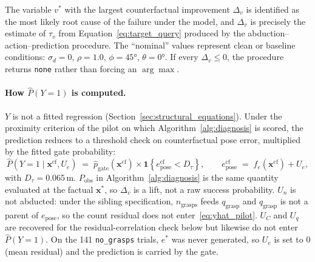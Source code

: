 \documentclass[11pt,a4paper]{report}
\begin{document}
The variable $v^*$ with the largest counterfactual improvement $\Delta_v$ is identified as the most likely root cause of the failure under the model, and $\Delta_v$ is precisely the estimate of $\tau_v$ from Equation~\eqref{eq:target_query} produced by the abduction--action--prediction procedure. The ``nominal'' values represent clean or baseline conditions: $\sigma_d = 0$, $\rho = 1.0$, $\phi = 45°$, $\theta = 0°$. If every $\Delta_v \le 0$, the procedure returns \texttt{none} rather than forcing an $\arg\max$.

\paragraph{How $\hat{P}(Y{=}1)$ is computed.} $Y$ is not a fitted regression (Section~\ref{sec:structural_equations}). Under the proximity criterion of the pilot on which Algorithm~\ref{alg:diagnosis} is scored, the prediction reduces to a threshold check on counterfactual pose error, multiplied by the fitted gate probability:
\begin{equation}
  \hat{P}(Y{=}1 \mid \mathbf{x}^{\mathrm{cf}}, U_e)
  \;=\;
  \hat{p}_{\mathrm{gate}}(\mathbf{x}^{\mathrm{cf}})
  \times
  \mathbf{1}\!\left\{e_{\mathrm{pose}}^{\mathrm{cf}} < D_\tau\right\},
  \qquad
  e_{\mathrm{pose}}^{\mathrm{cf}}
  \;=\;
  \hat{f}_e(\mathbf{x}^{\mathrm{cf}}) + U_e,
  \label{eq:yhat_pilot}
\end{equation}
with $D_\tau = 0.065$\,m. $P_{\mathrm{obs}}$ in Algorithm~\ref{alg:diagnosis} is the same quantity evaluated at the factual $\mathbf{x}^*$, so $\Delta_v$ is a lift, not a raw success probability. $U_n$ is not abducted: under the sibling specification, $n_{\text{grasps}}$ feeds $q_{\text{grasp}}$ and $q_{\text{grasp}}$ is not a parent of $e_{\text{pose}}$, so the count residual does not enter~\eqref{eq:yhat_pilot}. $U_C$ and $U_q$ are recovered for the residual-correlation check below but likewise do not enter $\hat{P}(Y{=}1)$. On the 141 \texttt{no\_grasps} trials, $e^*$ was never generated, so $U_e$ is set to 0 (mean residual) and the prediction is carried by the gate.
\end{document}
